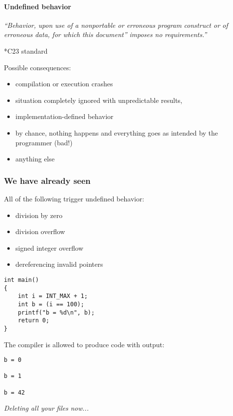 \documentclass[12pt]{article}
\begin{document}
\paragraph{Undefined behavior}

\textit{``Behavior, upon use of a nonportable or erroneous program construct or of erroneous data, for which this document'' imposes no requirements.''}

\begin{flushright}
\tiny{*C23 standard}
\end{flushright}

Possible consequences:
\begin{itemize}
  \item compilation or execution crashes
  \item situation completely ignored with unpredictable results,
  \item implementation-defined behavior
  \item by chance, nothing happens and everything goes as intended by the programmer (bad!)
  \item anything else
\end{itemize}

\subsubsection{We have already seen}

All of the following trigger undefined behavior:
\begin{itemize}
  \item division by zero
  \item division overflow
  \item signed integer overflow
  \item dereferencing invalid pointers
\end{itemize}

\begin{verbatim}
int main()
{
    int i = INT_MAX + 1;
    int b = (i == 100);
    printf("b = %d\n", b);
    return 0;
}
\end{verbatim}

The compiler is allowed to produce code with output:

\begin{verbatim}
b = 0

b = 1

b = 42
\end{verbatim}

\textit{Deleting all your files now...}
\end{document}
